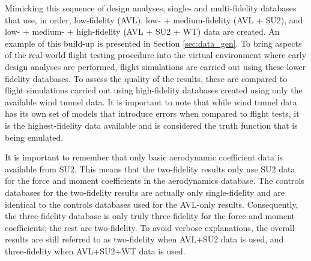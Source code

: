 Mimicking this sequence of design analyses, single- and multi-fidelity databases that use, in order, low-fidelity (AVL), low- + medium-fidelity (AVL + SU2), and low- + medium- + high-fidelity (AVL + SU2 + WT) data are created. 
An example of this build-up is presented in Section \ref{sec:data_gen}.
To bring aspects of the real-world flight testing procedure into the virtual environment where early design analyses are performed, flight simulations are carried out using these lower fidelity databases.
To assess the quality of the results, these are compared to flight simulations carried out using high-fidelity databases created using only the available wind tunnel data. 
It is important to note that while wind tunnel data has its own set of models that introduce errors when compared to flight tests, it is the highest-fidelity data available and is considered the truth function that is being emulated. 

It is important to remember that only basic aerodynamic coefficient data is available from SU2. 
This means that the two-fidelity results only use SU2 data for the force and moment coefficients in the aerodynamics database.
The controls databases for the two-fidelity results are actually only single-fidelity and are identical to the controls databases used for the AVL-only results. 
Consequently, the three-fidelity database is only truly three-fidelity for the force and moment coefficients; the rest are two-fidelity.
To avoid verbose explanations, the overall results are still referred to as two-fidelity when AVL+SU2 data is used, and three-fidelity when AVL+SU2+WT data is used. 

